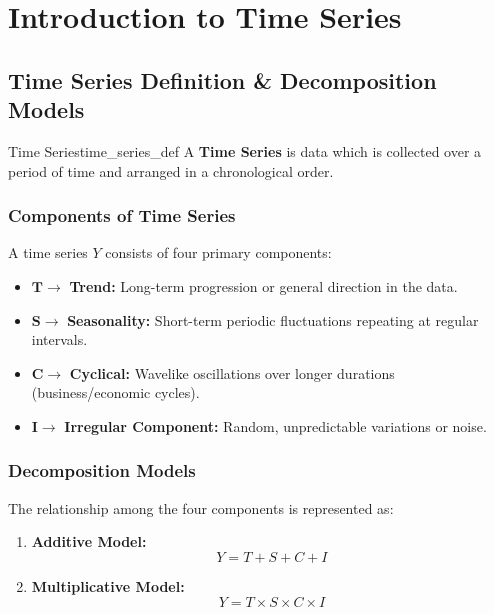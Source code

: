 \chapter{Introduction to Time Series}
\label{ch:intro_time_series}

\section{Time Series Definition \& Decomposition Models}

\begin{definition}{Time Series}{time_series_def}
A \textbf{Time Series} is data which is collected over a period of time and arranged in a chronological order.
\end{definition}

\subsection{Components of Time Series}
A time series $Y$ consists of four primary components:
\begin{itemize}[leftmargin=*]
    \item $\bm{T} \rightarrow$ \textbf{Trend:} Long-term progression or general direction in the data.
    \item $\bm{S} \rightarrow$ \textbf{Seasonality:} Short-term periodic fluctuations repeating at regular intervals.
    \item $\bm{C} \rightarrow$ \textbf{Cyclical:} Wavelike oscillations over longer durations (business/economic cycles).
    \item $\bm{I} \rightarrow$ \textbf{Irregular Component:} Random, unpredictable variations or noise.
\end{itemize}

\subsection{Decomposition Models}
The relationship among the four components is represented as:

\begin{formulabox}
\begin{enumerate}[leftmargin=*]
    \item \textbf{Additive Model:}
    \begin{equation}
        Y = T + S + C + I
    \end{equation}
    
    \item \textbf{Multiplicative Model:}
    \begin{equation}
        Y = T \times S \times C \times I
    \end{equation}
\end{enumerate}
\end{formulabox}

